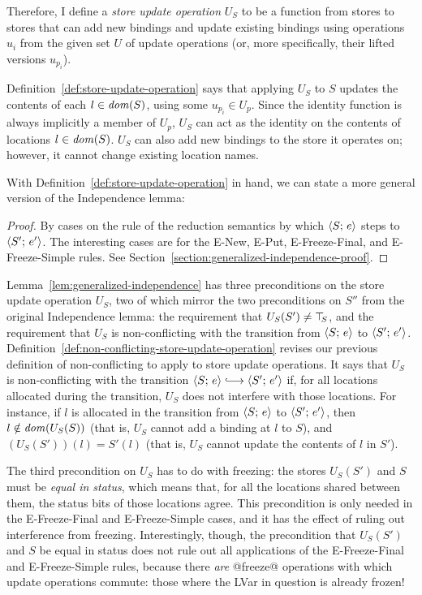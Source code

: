 Therefore, I define a \emph{store update operation} $U_S$ to be a
function from stores to stores that can add new bindings and update
existing bindings using operations $u_i$ from the given set $U$ of
update operations (or, more specifically, their lifted versions
$u_{p_i}$).

\DefStoreUpdateOperation

Definition~\ref{def:store-update-operation} says that applying $U_S$
to $S$ updates the contents of each $l \in \mathit{dom}(S)$, using some
$u_{p_i} \in U_p$.  Since the identity function is always implicitly a
member of $U_p$, $U_S$ can act as the identity on the contents of
locations $l \in \mathit{dom}(S)$.  $U_S$ can also add new bindings to the
store it operates on; however, it cannot change existing location
names.

With Definition~\ref{def:store-update-operation} in hand, we can state
a more general version of the Independence lemma:

\LemGeneralizedIndependence
\begin{proof}
  By cases on the rule of the reduction semantics by which
  $\langle S;\, e \rangle$ steps to $\langle S';\, e' \rangle$.  The interesting cases
  are for the {\sc E-New}, {\sc E-Put}, {\sc E-Freeze-Final}, and {\sc
    E-Freeze-Simple} rules.  See
  Section~\ref{section:generalized-independence-proof}.
\end{proof}

Lemma~\ref{lem:generalized-independence} has three preconditions on
the store update operation $U_S$, two of which mirror the two
preconditions on $S''$ from the original Independence lemma: the
requirement that $U_S(S') \neq \top\hspace{-0.85mm}_{S}$, and the requirement that $U_S$
is non-conflicting with the transition from $\langle S;\, e \rangle$ to
$\langle S';\, e' \rangle$.
Definition~\ref{def:non-conflicting-store-update-operation} revises
our previous definition of non-conflicting to apply to store update
operations.  It says that $U_S$ is non-conflicting with the transition
$\config{S}{e} \parstepsto \config{S'}{e'}$ if, for all locations
allocated during the transition, $U_S$ does not interfere with those
locations.  For instance, if $l$ is allocated in the transition from
$\langle S;\, e \rangle$ to $\langle S';\, e' \rangle$, then $l \notin \mathit{dom}(U_S(S))$
(that is, $U_S$ cannot add a binding at $l$ to $S$), and $(U_S(S'))(l)
= S'(l)$ (that is, $U_S$ cannot update the contents of $l$ in $S'$).

\DefNonConflictingStoreUpdateOperation

The third precondition on $U_S$ has to do with freezing: the stores
$U_S(S')$ and $S$ must be \emph{equal in status}, which means that,
for all the locations shared between them, the status bits of those
locations agree.  This precondition is only needed in the {\sc
  E-Freeze-Final} and {\sc E-Freeze-Simple} cases, and it has the
effect of ruling out interference from freezing.  Interestingly,
though, the precondition that $U_S(S')$ and $S$ be equal in status
does not rule out all applications of the {\sc E-Freeze-Final} and
{\sc E-Freeze-Simple} rules, because there \emph{are} @freeze@
operations with which update operations commute: those where the LVar
in question is already frozen!

